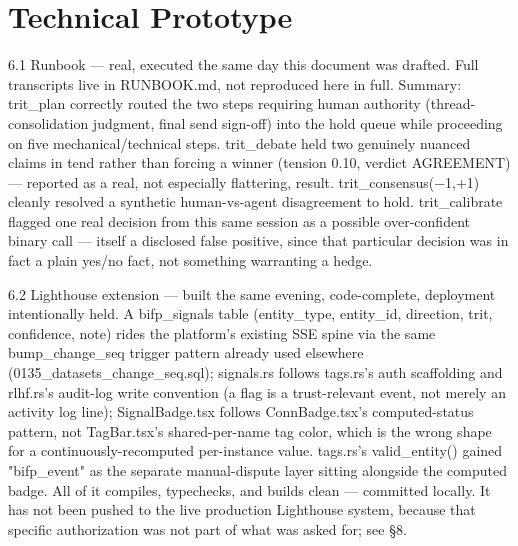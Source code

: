 \documentclass[11pt,a4paper]{article}
\begin{document}
\section{Technical Prototype}
6.1 Runbook — real, executed the same day this document was drafted. Full transcripts live in RUNBOOK.md, not reproduced here in full. Summary: trit\_plan correctly routed the two steps requiring human authority (thread-consolidation judgment, final send sign-off) into the hold queue while proceeding on five mechanical/technical steps. trit\_debate held two genuinely nuanced claims in tend rather than forcing a winner (tension 0.10, verdict AGREEMENT) — reported as a real, not especially flattering, result. trit\_consensus(−1,+1) cleanly resolved a synthetic human-vs-agent disagreement to hold. trit\_calibrate flagged one real decision from this same session as a possible over-confident binary call — itself a disclosed false positive, since that particular decision was in fact a plain yes/no fact, not something warranting a hedge.


6.2 Lighthouse extension — built the same evening, code-complete, deployment intentionally held. A bifp\_signals table (entity\_type, entity\_id, direction, trit, confidence, note) rides the platform's existing SSE spine via the same bump\_change\_seq trigger pattern already used elsewhere (0135\_datasets\_change\_seq.sql); signals.rs follows tags.rs's auth scaffolding and rlhf.rs's audit-log write convention (a flag is a trust-relevant event, not merely an activity log line); SignalBadge.tsx follows ConnBadge.tsx's computed-status pattern, not TagBar.tsx's shared-per-name tag color, which is the wrong shape for a continuously-recomputed per-instance value. tags.rs's valid\_entity() gained "bifp\_event" as the separate manual-dispute layer sitting alongside the computed badge. All of it compiles, typechecks, and builds clean — committed locally. It has not been pushed to the live production Lighthouse system, because that specific authorization was not part of what was asked for; see §8.
\end{document}
